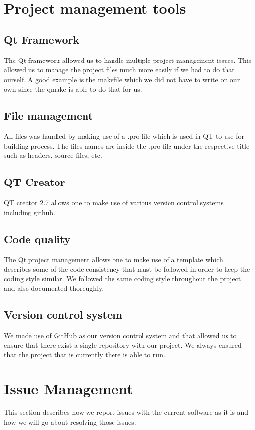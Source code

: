\documentclass[a4paper,12pt,final]{article}
\begin{document}
\newpage

\section{Project management tools}
\subsection{Qt Framework}
The Qt framework allowed us to handle multiple project management issues. This allowed us to manage the project files much more easily if we had to do that ourself. A good example is the makefile which we did not have to write on our own since the qmake is able to do that for us.

\subsection{File management}
All files was handled by making use of a .pro file which is used in QT to use for building process. The files names are inside the .pro file under the respective title such as headers, source files, etc.

\subsection{QT Creator}
QT creator 2.7 allows one to make use of various version control systems including github.


\subsection{Code quality}
The Qt project management allows one to make use of a template which describes some of the code consistency that must be followed in order to keep the coding style similar. We followed the same coding style throughout the project and also documented thoroughly.

\subsection{Version control system}
We made use of GitHub as our version control system and that allowed us to ensure that there exist a single repository with our project. We always ensured that the project that is currently there is able to run.

\section{Issue Management}
This section describes how we report issues with the current software as it is and how we will go about resolving those issues. 
\end{document}
